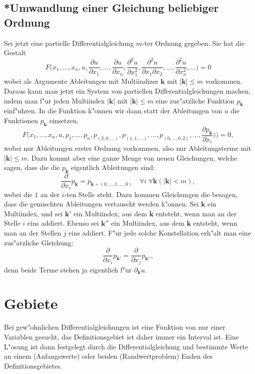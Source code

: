 \subsection{*Umwandlung einer Gleichung beliebiger Ordnung\label{klassifikation:beliebigeordnung}}
Sei jetzt eine partielle Differentialgleichung $m$-ter Ordnung
gegeben. Sie hat die Gestalt
\[
F\bigl(
x_1,\dots,x_n, u, \frac{\partial u}{\partial x_1},\dots,\frac{\partial u}{\partial x_n},\frac{\partial^2u}{\partial x_1^2},\frac{\partial^2 u}{\partial x_1\partial x_2},\dots,\frac{\partial^2u}{\partial x_n^2},\dots
\bigr)=0
\]
wobei als Argumente Ableitungen mit Multiindizes ${\mathbf k}$ mit
$|{\mathbf k}|\le m$ vorkommen. Daraus kann man jetzt ein System von
partiellen Differentialgleichungen machen, indem man f"ur jeden
Multiindex $|{\mathbf k}|$ mit $|{\mathbf k}|\le m$ eine zus"atzliche
Funktion $p_{\mathbf k}$ einf"uhren. In die Funktion k"onnen wir
dann statt der Ableitungen von $u$ die Funktionen $p_{\mathbf k}$
einsetzen.
\[
F\bigl(
x_1,\dots,x_n, u, p_1,\dots,p_n,p_{(2,0,\dots)},p_{(1,1,\dots)},
\dots,p_{(0,\dots,0,2)},\dots, \frac{\partial p_{\mathbf k}}{\partial x_i})
\bigr)=0,
\]
wobei nur Ableitungen erster Ordnung vorkommen, also nur Ableitungsterme
mit $|{\mathbf k}|\le m$.
Dazu kommt aber eine ganze Menge von neuen Gleichungen,
welche sagen, dass die die $p_{\mathbf k}$ eigentlich Ableitungen sind:
\[
\frac{\partial}{\partial x_i}p_{\mathbf k}=p_{{\mathbf k} + (0,\dots,1,\dots,0)}\quad\forall i\;\forall{\mathbf k}(|{\mathbf k}|<m),
\]
wobei die $1$ an der $i$-ten Stelle steht. Dazu kommen Gleichungen
die besagen, dass die gemischten Ableitungen vertauscht werden k"onnen.
Sei ${\mathbf k}$ ein Multiindex, und sei ${\mathbf k}'$ ein Multiindex,
aus dem ${\mathbf k}$ entsteht, wenn man an der Stelle $i$ eins addiert.
Ebenso sei ${\mathbf k}''$ ein Multiindex, aus dem ${\mathbf k}$ entsteht,
wenn man an der Stellen $j$ eins addiert. F"ur jede solche Konstellation
erh"alt man eine zus"atzliche Gleichung:
\[
\frac{\partial}{\partial x_i}p_{{\mathbf k}'}=\frac{\partial}{\partial x_j}p_{{\mathbf k}''},
\]
denn beide Terme stehen ja eigentlich f"ur $\partial_{\mathbf k}u$.
 
\section{Gebiete\label{klassifikation:gebiete}}
Bei gew"ohnlichen Differentialgleichungen ist eine
Funktion von nur einer Variablen gesucht, das Definitionsgebiet ist
daher immer ein Interval ist.
Eine L"osung ist dann festgelegt durch die Differentialgleichung
und bestimmte Werte an einem (Anfangswerte) oder beiden (Randwertproblem)
Enden des Definitionsgebietes.

